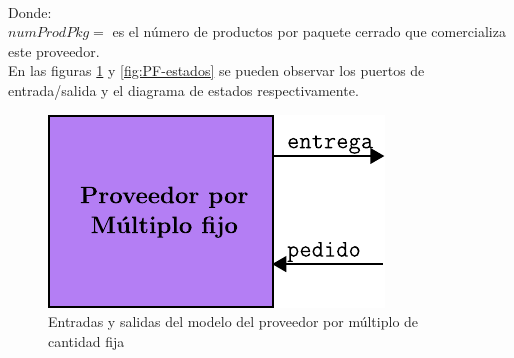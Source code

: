 \documentclass[10pt]{article}
\begin{document}
\\

Donde:\\
$numProdPkg = $ es el número de productos por paquete cerrado que comercializa este proveedor.\\

En las figuras \ref{fig:PF-esquematico} y \ref{fig:PF-estados} se pueden observar los puertos de entrada/salida y el diagrama de estados respectivamente.

\begin{figure}[htbp]
	\centering
	\includegraphics{img/PF-esquematico}
	\caption{Entradas y salidas del modelo del proveedor por múltiplo de cantidad fija}
	\label{fig:PF-esquematico}
\end{figure}
\end{document}
